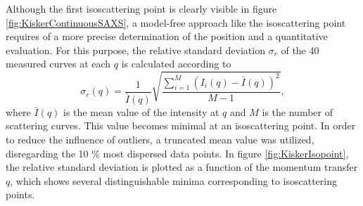 Although the first isoscattering point is clearly visible in figure \ref{fig:KiskerContinuousSAXS}, a model-free approach like the isoscattering point requires of a more precise determination of the position and a quantitative evaluation. For this purpose, the relative standard deviation $\sigma_r$ of the 40 measured curves at each \(q\) is calculated according to
\begin{equation}
\sigma_r (q)=\frac{1}{\bar{I}(q)}\sqrt{\frac{\sum^{M}_{i=1} (I_i(q) -\bar{I} (q))^2 }{M-1}} ,
\end{equation}
where \(\bar{I} (q)\) is the mean value of the intensity at \(q\) and \( M \) is the number of scattering curves. This value becomes minimal at an isoscattering point. In order to reduce the influence of outliers, a truncated mean value was utilized, disregarding the 10 $\%$ most dispersed data points. In figure \ref{fig:KiskerIsopoint}, the relative standard deviation is plotted as a function of the momentum transfer \(q\), which shows several distinguishable minima corresponding to isoscattering points.

%		


